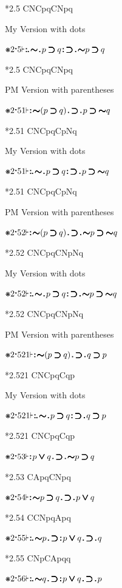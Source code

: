 \documentclass[12pt]{article}
\newcommand{\pmthm}{\mathpunct{\text{\scalebox{.5}[1]{$\boldsymbol\vdash$}}}} %
\newcommand{\pmast}{\text{\resizebox{!}{.75\height}{\ding{107}}}} %
\newcommand{\pmcdot}{\text{\raisebox{.05cm}{$\boldsymbol\cdot$}}} %
\newcommand{\pmd}{\hbox{\rule{.3ex}{.3ex}}} %
\newcommand{\pmdd}{\overset{\pmd}{\pmd}} %
\newcommand{\pmdot}{\mathinner{\pmd}}
\newcommand{\pmdott}{\mathinner{\pmdd}}
\newcommand{\pmdottt}{\mathinner{\pmdd\hspace{1pt}\pmd}}
\newcommand{\pmnot}{\mathord{\ooalign{$\boldsymbol{\sim}\mkern.5mu$\hidewidth\cr$\boldsymbol{\sim}$\cr\hidewidth$\mkern.5mu\boldsymbol{\sim}$}}}
\newcommand{\pmor}{\mathbin{\ooalign{$\boldsymbol{\vee}\mkern.5mu$\hidewidth\cr$\boldsymbol{\vee}$\cr\hidewidth$\mkern.5mu\boldsymbol{\vee}$}}}
\newcommand{\pmimp}{\mathbin{\ooalign{$\boldsymbol{\supset}\mkern.5mu$\hidewidth\cr$\boldsymbol{\supset}$\cr\hidewidth$\mkern.5mu\boldsymbol{\supset}$}}} %
\begin{document}
*2.5 CNCpqCNpq

My Version with dots

$\pmast 2 \pmcdot 5 \pmthm \pmdottt \pmnot \pmdot p \pmimp q  \pmdott \pmimp \pmdot \pmnot p \pmimp  q    $

*2.5 CNCpqCNpq


PM Version with parentheses

$\pmast 2 \pmcdot 51 \pmthm \pmdott \pmnot ( p \pmimp q ) \pmdot \pmimp \pmdot  p \pmimp \pmnot q      $

*2.51 CNCpqCpNq

My Version with dots

$\pmast 2 \pmcdot 51 \pmthm \pmdottt \pmnot \pmdot p \pmimp q  \pmdott \pmimp \pmdot p \pmimp  \pmnot q    $

*2.51 CNCpqCpNq

PM Version with parentheses

$\pmast 2 \pmcdot 52 \pmthm \pmdott \pmnot ( p \pmimp q ) \pmdot \pmimp \pmdot  \pmnot p \pmimp \pmnot q      $

*2.52 CNCpqCNpNq

My Version with dots

$\pmast 2 \pmcdot 52 \pmthm \pmdottt \pmnot \pmdot p \pmimp q  \pmdott \pmimp \pmdot \pmnot p \pmimp  \pmnot q    $

*2.52 CNCpqCNpNq

PM Version with parentheses

$\pmast 2 \pmcdot 521 \pmthm \pmdott \pmnot ( p \pmimp q ) \pmdot \pmimp \pmdot  q \pmimp p      $


*2.521 CNCpqCqp

My Version with dots

$\pmast 2 \pmcdot 521 \pmthm \pmdottt \pmnot \pmdot p \pmimp q  \pmdott \pmimp \pmdot q \pmimp p    $

*2.521 CNCpqCqp

$\pmast 2 \pmcdot 53 \pmthm \pmdott p \pmor q \pmdot \pmimp \pmdot \pmnot p \pmimp q     $

*2.53 CApqCNpq

$\pmast 2 \pmcdot 54 \pmthm \pmdott \pmnot p \pmimp q \pmdot \pmimp \pmdot  p \pmor q     $

*2.54 CCNpqApq

$\pmast 2 \pmcdot 55 \pmthm \pmdottt \pmnot p \pmdot \pmimp \pmdott p \pmor q \pmdot \pmimp \pmdot q    $

*2.55 CNpCApqq

$\pmast 2 \pmcdot 56 \pmthm \pmdottt \pmnot q \pmdot \pmimp \pmdott p \pmor q \pmdot \pmimp \pmdot p      $
\end{document}
